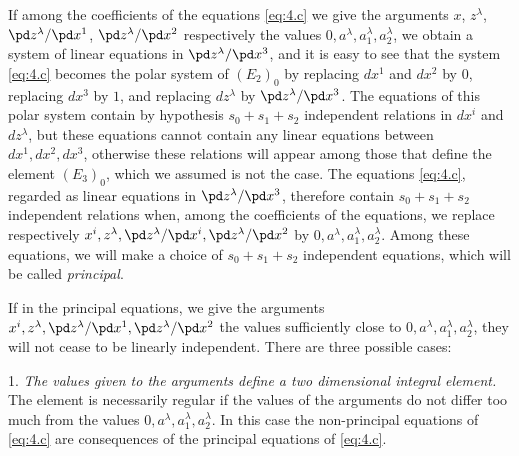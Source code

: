 \vspace{12pt}\fsec If among the coefficients of the equations \eqref{eq:4.c} we give the arguments $x$, $z^{\lambda}$, $\pd z^{\lambda}/\pd x^{1}$, $\pd z^{\lambda}/\pd x^{2}$ respectively the values $0,a^{\lambda},a^{\lambda}_{1},a^{\lambda}_{2}$, we obtain a system of linear equations in $\pd z^{\lambda}/\pd x^{3}$, and it is easy to see that the system \eqref{eq:4.c} becomes the polar system of $(E_{2})_{0}$ by replacing $dx^{1}$ and $dx^{2}$ by $0$, replacing $dx^{3}$ by $1$, and replacing $dz^{\lambda}$ by $\pd z^{\lambda}/\pd x^{3}$. The equations of this polar system contain by hypothesis $s_{0}+s_{1}+s_{2}$ independent relations in $dx^{i}$ and $dz^{\lambda}$, but these equations cannot contain any linear equations between $dx^{1}, dx^{2}, dx^{3}$, otherwise these relations will appear among those that define the element $(E_{3})_{0}$, which we assumed is not the case. The equations \eqref{eq:4.c}, regarded as linear equations in $\pd z^{\lambda}/\pd x^{3}$, therefore contain $s_{0}+s_{1}+s_{2}$ independent relations when, among the coefficients of the equations, we replace respectively $x^{i},z^{\lambda}, \pd z^{\lambda}/\pd x^{i}, \pd z^{\lambda}/\pd x^{2}$ by $0,a^{\lambda},a_{1}^{\lambda},a_{2}^{\lambda}$. Among these equations, we will make a choice of $s_{0}+s_{1}+s_{2}$ independent equations, which will be called \emph{principal}.

If in the principal equations, we give the arguments $x^{i}, z^{\lambda}, \pd z^{\lambda}/\pd x^{1}, \pd z^{\lambda}/\pd x^{2}$ the values sufficiently close to $0, a^{\lambda}, a_{1}^{\lambda}, a_{2}^{\lambda}$, they will not cease to be linearly independent. There are three possible cases:
\vspace{12pt}

1. \emph{The values given to the arguments define a two dimensional integral element.} The element is necessarily regular if the values of the arguments do not differ too much from the values $0, a^{\lambda}, a_{1}^{\lambda}, a_{2}^{\lambda}$. In this case the non-principal equations of \eqref{eq:4.c} are consequences of the principal equations of \eqref{eq:4.c}.
\vspace{12pt}

